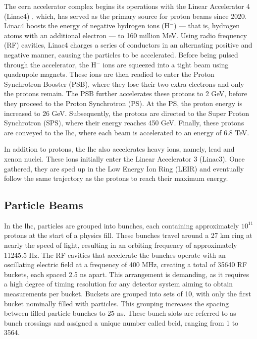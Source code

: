 The \acrshort{cern} accelerator complex begins its operations with the Linear Accelerator 4 (Linac4) \cite{Linac4}, which, has served as the primary source for proton beams since 2020. Linac4 boosts the energy of negative hydrogen ions (H$^-$) --- that is, hydrogen atoms with an additional electron --- to 160 million MeV. Using radio frequency (RF) cavities, Linac4 charges a series of conductors in an alternating positive and negative manner, causing the particles to be accelerated. Before being pulsed through the accelerator, the H$^-$ ions are squeezed into a tight beam using quadrupole magnets. These ions are then readied to enter the Proton Synchrotron Booster (PSB), where they lose their two extra electrons and only the protons remain. The PSB further accelerates these protons to 2 GeV, before they proceed to the Proton Synchrotron (PS). At the PS, the proton energy is increased to 26 GeV. Subsequently, the protons are directed to the Super Proton Synchrotron (SPS), where their energy reaches 450 GeV. Finally, these protons are conveyed to the \acrshort{lhc}, where each beam is accelerated to an energy of 6.8 TeV.

In addition to protons, the \acrshort{lhc} also accelerates heavy ions, namely, lead and xenon nuclei. These ions initially enter the Linear Accelerator 3 (Linac3). Once gathered, they are sped up in the Low Energy Ion Ring (LEIR) and eventually follow the same trajectory as the protons to reach their maximum energy.


\subsection{Particle Beams}
\label{subsec:particle_beams_lhc}

In the \acrshort{lhc}, particles are grouped into bunches, each containing approximately $10^{11}$ protons at the start of a physics fill. These bunches travel around a 27 km ring at nearly the speed of light, resulting in an orbiting frequency of approximately 11245.5 Hz. The RF cavities that accelerate the bunches operate with an oscillating electric field at a frequency of 400 MHz, creating a total of 35640 RF buckets, each spaced 2.5 ns apart. This arrangement is demanding, as it requires a high degree of timing resolution for any detector system aiming to obtain measurements per bucket. Buckets are grouped into sets of 10, with only the first bucket nominally filled with particles. This grouping increases the spacing between filled particle bunches to 25 ns. These bunch slots are referred to as bunch crossings and assigned a unique number called \acrfull{bcid}, ranging from 1 to 3564.

